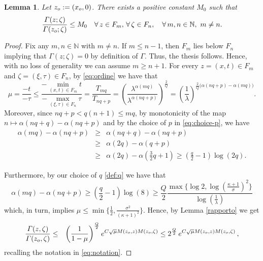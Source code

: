 \documentclass{amsart}
\newtheorem{lemma}[thm]{Lemma}
\numberwithin{equation}{section}
\renewcommand{\Gamma}{\varGamma}
\begin{document}
{\begin{lemma}
Let $z_{\rm o}:=(x_{\rm o},0)$. There exists a positive constant $M_0$ such that
\[
\frac{\Gamma(z;\zeta)}{\Gamma(z_{\rm o};\zeta)}\leq M_0\quad\forall\,z\in F_m,\,\forall\,\zeta\in F_n,\quad\forall\,m,n\in\mathbb{N},\,\,m\neq n.
\]
\end{lemma}
\begin{proof}
Fix any $m,n\in \mathbb{N}$ with $m\neq n$. If $m\leq n-1$, then $F_m$ lies below $F_n$ implying that $\Gamma(z;\zeta)=0$ by definition of $\Gamma$. Thus, the thesis follows. Hence, with no loss of generality we can assume $m\geq n+1$. For every $z=(x,t)\in F_m$ and $\zeta=(\xi,\tau)\in F_n$, by \eqref{eq:ordine} we have that
\[
\mu=\frac{-t}{-\tau}\leq \frac{-\min\limits_{(x,t) \in F_m}t}{-\max\limits_{(\xi,\tau) \in F_n}\tau} = \frac{T_{mq}}{T_{nq+p}} =\left(\frac{\lambda^{\alpha(mq)}}{\lambda^{\alpha(nq+p)}}\right)^{\frac{2}{Q}}=\left(\frac{1}{\lambda}\right)^{\frac{2}{Q}\big(\alpha(nq+p)-\alpha(mq) \big)}.
\]
Moreover, since $nq+p < q(n+1) \leq mq$, by monotonicity of the map $n \mapsto \alpha(nq+q)-\alpha(nq+p)$ and by the choice of $p$ in \eqref{eq:choice-p}, we have
\begin{eqnarray*}
\alpha(mq)-\alpha(nq+p) & \geq & \alpha(nq+q)-\alpha(nq+p)\\
& \geq & \alpha(2q)-\alpha(q+p)\\
& \geq & \alpha(2q)-\alpha\left(\frac{3}{2}q+1\right) \geq \left(\frac{q}{2}-1\right)\log{(2q)}.
\end{eqnarray*}

Furthermore, by our choice of $q$ \eqref{def:q} we have that
\[
\alpha(mq)-\alpha(nq+p)\geq\left(\frac{q}{2}-1\right)\log{(8)}\geq\frac{Q}{2}\frac{\max{\{\log{2},\log{(\frac{\kappa+1}{\sigma})^2}\}}}{\log{(\frac{1}{\lambda})}}
\]
which, in turn, implies $\mu\leq \min{\{\frac{1}{2},\frac{\sigma^2}{(\kappa+1)^2}\}}$. Hence, by Lemma \ref{rapporto} we get
\begin{eqnarray*}
\frac{\Gamma(z,\zeta)}{\Gamma(z_{\rm o},\zeta)} & \leq & \left(\frac{1}{1-\mu}\right)^{\frac{Q}{2}}e^{C\sqrt{\mu}M(z_{\rm o},z)M(z_{\rm o},\zeta)} \leq   2^{\frac{Q}{2}}\,e^{C\sqrt{\mu}M(z_{\rm o},z)M(z_{\rm o},\zeta)}\,,
\end{eqnarray*}
recalling the notation in \eqref{eq:notation}. 


\end{proof}}
\end{document}
